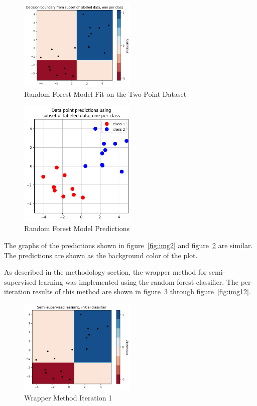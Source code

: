 \begin{figure}[H]
    \centering
    \includegraphics[width=0.5\textwidth]{images/img3.png}
    \caption{Random Forest Model Fit on the Two-Point Dataset}
    \label{fig:img3}
\end{figure}

\begin{figure}[H]
    \centering
    \includegraphics[width=0.5\textwidth]{images/img4.png}
    \caption{Random Forest Model Predictions}
    \label{fig:img4}
\end{figure}

The graphs of the predictions shown in figure~\ref{fig:img2} and figure~\ref{fig:img4} are similar. The predictions are shown as the background color of the plot. 

As described in the methodology section, the wrapper method for semi-supervised learning was implemented using the random forest classifier. The per-iteration results of this method are shown in figure~\ref{fig:img5} through figure~\ref{fig:img12}.  

\begin{figure}[H]
    \centering
    \includegraphics[width=0.5\textwidth]{images/img5.png}
    \caption{Wrapper Method Iteration 1}
    \label{fig:img5}
\end{figure}

